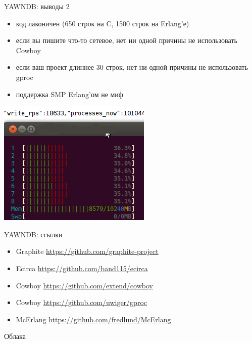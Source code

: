 \documentclass[10pt]{beamer}
\begin{document}
\begin{frame}{YAWNDB: выводы 2}
  \begin{itemize}
  \item код лаконичен (650 строк на C, 1500 строк на Erlang'е)
  \item если вы пишите что-то сетевое, нет ни одной причины не использовать Cowboy
  \item если ваш проект длиннее 30 строк, нет ни одной причины не использовать gproc
  \item поддержка SMP Erlang'ом не миф
  \end{itemize}
  \begin{center}
    \includegraphics[width=.5\textwidth]{top.png}
  \end{center}
\end{frame}

\begin{frame}{YAWNDB: ссылки}
  \begin{itemize}
  \item Graphite \url{https://github.com/graphite-project}
  \item Ecirca \url{https://github.com/band115/ecirca}
  \item Cowboy \url{https://github.com/extend/cowboy}
  \item Cowboy \url{https://github.com/uwiger/gproc}
  \item McErlang \url{https://github.com/fredlund/McErlang}
  \end{itemize}
\end{frame}

\begin{frame}
  \begin{center}
    \Large
    Облака
  \end{center}
\end{frame}
\end{document}
